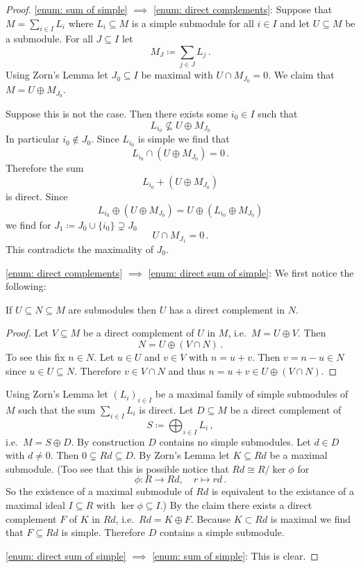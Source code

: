 \begin{proof}
  \ref{enum: sum of simple} $\implies$ \ref{enum: direct complements}:
  Suppose that $M = \sum_{i \in I} L_i$ where $L_i \subseteq M$ is a simple submodule for all $i \in I$ and let $U \subseteq M$ be a submodule.
  For all $J \subseteq I$ let
  \[
              M_J
    \coloneqq \sum_{j \in J} L_j \,.
  \]
  Using Zorn’s Lemma let $J_0 \subseteq I$ be maximal with \mbox{$U \cap M_{J_0} = 0$}.
  We claim that $M = U \oplus M_{J_0}$.
  
  Suppose this is not the case.
  Then there exists some $i_0 \in I$ such that
  \[
                L_{i_0}
    \nsubseteq  U \oplus M_{J_0}
  \]
  In particular $i_0 \notin J_0$.
  Since $L_{i_0}$ is simple we find that
  \[
      L_{i_0} \cap (U \oplus M_{J_0})
    = 0 \,.
  \]
  Therefore the sum
  \[
    L_{i_0} + (U \oplus M_{J_0})
  \]
  is direct. Since
  \[
      L_{i_0} \oplus (U \oplus M_{J_0})
    = U \oplus (L_{i_0} \oplus M_{J_0})
  \]
  we find for $J_1 \coloneqq J_0 \cup \{i_0\} \supsetneq J_0$
  \[
      U \cap M_{J_1}
    = 0 \,.
  \]
  This contradicts the maximality of $J_0$.
  
  \ref{enum: direct complements} $\implies$ \ref{enum: direct sum of simple}:
  We first notice the following:
  
  \begin{claim}
    If $U \subseteq N \subseteq M$ are submodules then $U$ has a direct complement in $N$.
  \end{claim}
  \begin{proof}
    Let $V \subseteq M$ be a direct complement of $U$ in $M$, i.e.\ $M = U \oplus V$.
    Then
    \[
      N = U \oplus (V \cap N) \,.
    \]
    To see this fix $n \in N$.
    Let $u \in U$ and $v \in V$ with $n = u + v$.
    Then $v = n - u \in N$ since $u \in U \subseteq N$.
    Therefore $v \in V \cap N$ and thus $n = u + v \in U \oplus (V \cap N)$.
  \end{proof}
  
  Using Zorn’s Lemma let $(L_i)_{i \in I}$ be a maximal family of simple submodules of $M$ such that the sum $\sum_{i \in I} L_i$ is direct.
  Let $D \subseteq M$ be a direct complement of
  \[
              S
    \coloneqq \bigoplus_{i \in I} L_i \,,
  \]
  i.e.\ $M = S \oplus D$.
  By construction $D$ contains no simple submodules.
  Let $d \in D$ with $d \neq 0$.
  Then $0 \subsetneq Rd \subseteq D$.
  By Zorn’s Lemma let $K \subseteq Rd$ be a maximal submodule.
  (Too see that this is possible notice that $Rd \cong R / \ker \phi$ for
  \[
            \phi
    \colon  R
    \to     Rd,
    \quad   r
    \mapsto rd \,.
  \]
  So the existence of a maximal submodule of $Rd$ is equivalent to the existance of a maximal ideal $I \subseteq R$ with $\ker \phi \subseteq I$.)
  By the claim there exists a direct complement $F$ of $K$ in $Rd$, i.e.\ $Rd = K \oplus F$.
  Because $K \subset Rd$ is maximal we find that $F \subseteq Rd$ is simple.
  Therefore $D$ contains a simple submodule.
  
  \ref{enum: direct sum of simple} $\implies$ \ref{enum: sum of simple}:
  This is clear.
\end{proof}


